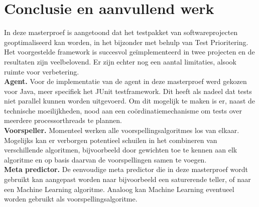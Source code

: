 \section{Conclusie en aanvullend werk}
\noindent In deze masterproef is aangetoond dat het testpakket van softwareprojecten geoptimaliseerd kan worden, in het bijzonder met behulp van Test Prioritering. Het voorgestelde framework is succesvol ge\"implementeerd in twee projecten en de resultaten zijn veelbelovend. Er zijn echter nog een aantal limitaties, alsook ruimte voor verbetering.\\

\noindent \textbf{Agent.}
Voor de implementatie van de agent in deze masterproef werd gekozen voor Java, meer specifiek het JUnit testframework. Dit heeft als nadeel dat tests niet parallel kunnen worden uitgevoerd. Om dit mogelijk te maken is er, naast de technische moeilijkheden, nood aan een co\"ordinatiemechanisme om tests over meerdere processorthreads te plannen.\\

\noindent \textbf{Voorspeller.}
Momenteel werken alle voorspellingsalgoritmes los van elkaar. Mogelijks kan er verborgen potentieel schuilen in het combineren van verschillende algoritmen, bijvoorbeeld door gewichten toe te kennen aan elk algoritme en op basis daarvan de voorspellingen samen te voegen.\\

\noindent \textbf{Meta predictor.}
De eenvoudige meta predictor die in deze masterproef wordt gebruikt kan aangepast worden naar bijvoorbeeld een saturerende teller, of naar een Machine Learning algoritme. Analoog kan Machine Learning eventueel worden gebruikt als voorspellingsalgoritme.
